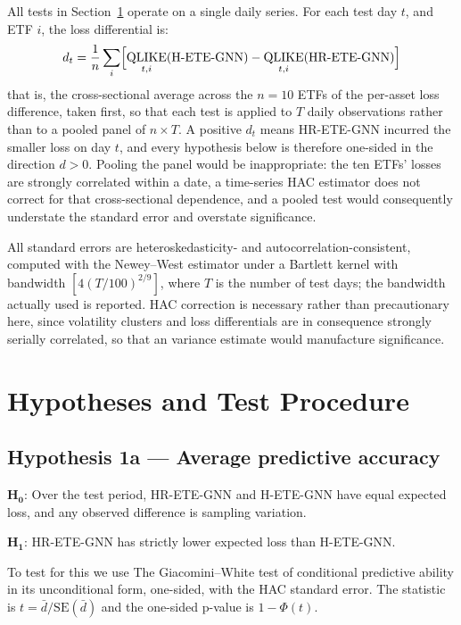 \documentclass[12pt,oneside]{report}
\DeclareMathOperator{\QLIKE}{QLIKE}
\begin{document}
All tests in Section~\ref{sec:hypotheses} operate on a single daily
series. For each test day $t$, and ETF $i$, the loss differential is:
\[
  d_{t} = \frac{1}{n}\sum_{i}\Bigl[\QLIKE_{t,i}(\text{H-ETE-GNN})
          - \QLIKE_{t,i}(\text{HR-ETE-GNN})\Bigr]
\]
that is, the cross-sectional average across the $n = 10$ ETFs of the
per-asset loss difference, taken first, so that each test is applied to
$T$ daily observations rather than to a pooled panel of $n \times T$. A
positive $d_{t}$ means HR-ETE-GNN incurred the smaller loss on day $t$,
and every hypothesis below is therefore one-sided in the direction
$d > 0$. Pooling the panel would be inappropriate: the ten ETFs' losses
are strongly correlated within a date, a time-series HAC estimator does
not correct for that cross-sectional dependence, and a pooled test would
consequently understate the standard error and overstate significance.

All standard errors are heteroskedasticity- and
autocorrelation-consistent, computed with the Newey--West estimator
\cite{newey1987} under a Bartlett kernel with bandwidth
$\left[4(T/100)^{2/9}\right]$, where $T$ is the number of test days; the
bandwidth actually used is reported. HAC correction is necessary rather
than precautionary here, since volatility clusters and loss
differentials are in consequence strongly serially correlated, so that
an variance estimate would manufacture significance.

\section{Hypotheses and Test Procedure}\label{sec:hypotheses}

\subsection{Hypothesis 1a --- Average predictive accuracy}\label{sec:h1a}

\textbf{$\boldsymbol{H_0}$}: Over the test period, HR-ETE-GNN and
H-ETE-GNN have equal expected loss, and any observed difference is
sampling variation.

\textbf{$\boldsymbol{H_1}$}: HR-ETE-GNN has strictly lower expected loss
than H-ETE-GNN.

To test for this we use The Giacomini--White test of conditional
predictive ability \cite{giacomini2006} in its unconditional form,
one-sided, with the HAC standard error. The statistic is
$t = \bar{d} / \mathrm{SE}(\bar{d})$ and the one-sided p-value is
$1 - \Phi(t)$.
\end{document}
